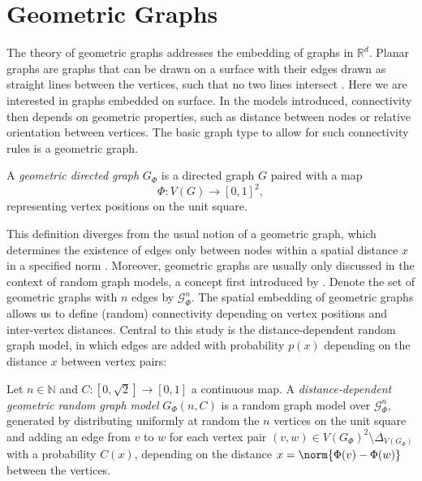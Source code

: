 






\section{Geometric Graphs}\label{sec:geometric_graphs} 


The theory of geometric graphs addresses the embedding of graphs in
$\mathbb{R}^d$.  Planar graphs are graphs that can be drawn on a
surface with their edges drawn as straight lines between the vertices,
such that no two lines intersect
\parencite{Diestel_Graph-theory}. %
Here we are interested in graphs embedded on surface. In the models
introduced, connectivity then depends on geometric properties, such as
distance between nodes or relative orientation between vertices. The
basic graph type to allow for such connectivity rules is a geometric
graph.

\begin{definition}
  A \textit{geometric directed graph}
  $G_{\Phi}$ is a directed graph $G$ paired with a map
  \[
    \Phi:V(G) \to [0,1]^2,
  \]
  representing vertex positions on the unit square.
\end{definition}

This definition diverges from the usual notion of a geometric graph,
which determines the existence of edges only between nodes within a
spatial distance $x$ in a specified
norm \parencite{Penrose_Geometric-graph}. Moreover, geometric graphs
are usually only discussed in the context of random graph models, a
concept first introduced by \textcite{Gilbert1961}. Denote the set of
geometric graphs with $n$ edges by $\mathcal{G}_{\Phi}^n$. The spatial
embedding of geometric graphs allows us to define (random)
connectivity depending on vertex positions and inter-vertex distances.
Central to this study is the distance-dependent random graph model, in
which edges are added with probability $p(x)$ depending on the
distance $x$ between vertex pairs:

\begin{definition}
  \label{def:distance_dependent_graph}
  Let $n \in \mathbb{N}$ and $C: [0,\sqrt{2}] \to [0,1]$ a
  continuous %
  map.  A \textit{distance-dependent geometric random graph model}
  $G_{\Phi}(n,C)$ is a random graph model over $\mathcal{G}^n_{\Phi}$,
  generated by distributing uniformly at random the $n$ vertices on
  the unit square and adding an edge from $v$ to $w$ for each vertex
  pair $(v,w) \in {V(G_{\Phi})}^2 \setminus \Delta_{V(G_{\Phi})}$ with
  a probability $C(x)$, depending on the distance $x = \norm{\Phi(v) -
    \Phi(w)}$ between the vertices.
\end{definition}

